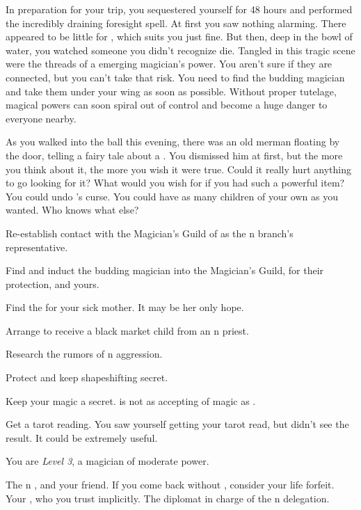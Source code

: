 \documentclass[char]{NeptuneBall}
\begin{document}
In preparation for your trip, you sequestered yourself for 48 hours and performed the incredibly draining foresight spell. At first you saw nothing alarming. There appeared to be little for \cPrince{}, which suits you just fine. But then, deep in the bowl of water, you watched someone you didn't recognize die. Tangled in this tragic scene were the threads of a emerging magician's power. You aren't sure if they are connected, but you can't take that risk. You need to find the budding magician and take them under your wing as soon as possible. Without proper tutelage, magical powers can soon spiral out of control and become a huge danger to everyone nearby.

As you walked into the ball this evening, there was an old merman floating by the door, telling a fairy tale about a \iWishingStone{\MYname}. You dismissed him at first, but the more you think about it, the more you wish it were true. Could it really hurt anything to go looking for it? What would you wish for if you had such a powerful item? You could undo \cPrince{}'s curse. You could have as many children of your own as you wanted. Who knows what else?

\begin{itemz}[Goals]
  \item Re-establish contact with the Magician's Guild of \pAtlantis{} as the \pPacifica{}n branch's representative.
  \item Find and induct the budding magician into the Magician's Guild, for their protection, and yours.
	\item Find the \iWishingStone{} for your sick mother. It may be her only hope.
  \item Arrange to receive a black market child from an \pAtlantis{}n priest.
  \item Research the rumors of \pIndia{}n aggression.
  \item Protect \cPrince{} and keep \cPrince{\their} shapeshifting secret.
	\item Keep your magic a secret. \pAtlantis{} is not as accepting of magic as \pPacifica{}.
	\item Get a tarot reading. You saw yourself getting your tarot read, but didn't see the result. It could be extremely useful.
\end{itemz}

\begin{itemz}[Notes]
	\item You are \emph{Level 3}, a magician of moderate power.
\end{itemz}

\begin{contacts}
  \contact{\cPrince{}} The \pPacifica{}n \cPrince{\Prince}, and your friend. If you come back without \cPrince{\them}, consider your life forfeit.
  \contact{\cSpy{}} Your \cSpy{\sibling}, who you trust implicitly.
  \contact{\cDiplomat{}} The diplomat in charge of the \pPacifica{}n delegation.
\end{contacts}
\end{document}
